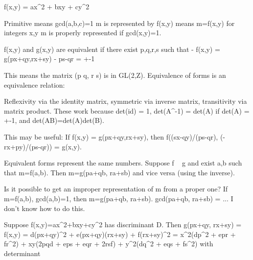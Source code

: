 f(x,y) = ax^2 + bxy + cy^2

Primitive means gcd(a,b,c)=1
m is represented by f(x,y) means
  m=f(x,y) for integers x,y
m is properly represented if gcd(x,y)=1.

f(x,y) and g(x,y) are equivalent if there exist
p,q,r,s such that
 - f(x,y) = g(px+qy,rx+sy)
 - ps-qr = +-1

This means the matrix (p q, r s) is in GL(2,Z).
Equivalence of forms is an equivalence relation:

Reflexivity via the identity matrix, symmetric via inverse matrix, transitivity via matrix product. These work because det(id) = 1, det(A^-1) = det(A) if det(A) = +-1, and det(AB)=det(A)det(B).

This may be useful: If f(x,y) = g(px+qy,rx+sy), then f((sx-qy)/(ps-qr), (-rx+py)/(ps-qr)) = g(x,y).

Equivalent forms represent the same numbers. Suppose f ~ g and exist a,b such that m=f(a,b). Then m=g(pa+qb, ra+sb) and vice versa (using the inverse).

Is it possible to get an improper representation of m from a proper one? If m=f(a,b), gcd(a,b)=1, then m=g(pa+qb, ra+sb). gcd(pa+qb, ra+sb) = ... I don't know how to do this.

Suppose f(x,y)=ax^2+bxy+cy^2 has discriminant D. Then g(px+qy, rx+sy) = f(x,y)
  = d(px+qy)^2 + e(px+qy)(rx+sy) + f(rx+sy)^2
  = x^2(dp^2 + epr + fr^2) + xy(2pqd + eps + eqr + 2rsf) + y^2(dq^2 + eqs + fs^2)
with determinant
